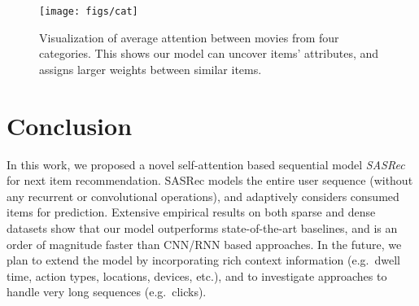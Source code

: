 \documentclass[conference]{IEEEtran}
\begin{document}
\begin{figure}[h]
\centering
\texttt{[image: figs/cat]}
\caption{Visualization of average attention between movies from four categories. This shows our model can uncover items' attributes, and assigns larger weights between similar items.}
\label{fig:vis_item}
\end{figure}





\section{Conclusion}

In this work, we proposed a novel self-attention based sequential model \emph{SASRec} for next item recommendation. SASRec models the entire user sequence (without any recurrent or convolutional operations), and adaptively considers consumed items for prediction. Extensive empirical results on both sparse and dense datasets show that our model outperforms state-of-the-art baselines, and is an order of magnitude faster than CNN/RNN based approaches.
In the future, we plan to extend the model by incorporating rich context information (e.g.~dwell time, action types, locations, devices, etc.), and to investigate approaches to handle very long sequences (e.g.~clicks).

\footnotesize

 
\end{document}
